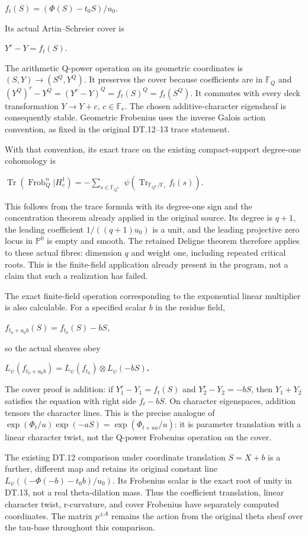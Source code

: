 \(f_t(S)=(\Phi(S)-t_0S)/u_0\).

Its actual Artin--Schreier cover is

\(Y^r-Y=f_t(S)\).

The arithmetic Q-power operation on its geometric coordinates is \((S,Y)\to (S^Q,Y^Q)\). It preserves the cover because coefficients are in \(\mathbb F_Q\) and \((Y^Q)^r-Y^Q=(Y^r-Y)^Q=f_t(S)^Q=f_t(S^Q)\). It commutes with every deck transformation \(Y\to Y+c\), \(c\in\mathbb F_r\). The chosen additive-character eigensheaf is consequently stable. Geometric Frobenius uses the inverse Galois action convention, as fixed in the original DT.12--13 trace statement.

With that convention, its exact trace on the existing compact-support degree-one cohomology is

\(\operatorname{Tr}(\operatorname{Frob}_Q^n|H_c^1)=-\sum_{s\in\mathbb F_{Q^n}}\) \(\psi(\operatorname{Tr}_{\mathbb F_{Q^n}/\mathbb F_r}f_t(s))\).

This follows from the trace formula with its degree-one sign and the concentration theorem already applied in the original source. Its degree is \(q+1\), the leading coefficient \(1/((q+1)u_0)\) is a unit, and the leading projective zero locus in \(\mathbb P^0\) is empty and smooth. The retained Deligne theorem therefore applies to these actual fibres: dimension \(q\) and weight one, including repeated critical roots. This is the finite-field application already present in the program, not a claim that such a realization has failed.

The exact finite-field operation corresponding to the exponential linear multiplier is also calculable. For a specified scalar \(b\) in the residue field,

\(f_{t_0+u_0 b}(S)=f_{t_0}(S)-bS\),

so the actual sheaves obey

\textbf{\(L_\psi(f_{t_0+u_0b})=L_\psi(f_{t_0}) \otimes L_\psi(-bS)\).}

The cover proof is addition: if \(Y_1^r-Y_1=f_t(S)\) and \(Y_2^r-Y_2=-bS\), then \(Y_1+Y_2\) satisfies the equation with right side \(f_t-bS\). On character eigenspaces, addition tensors the character lines. This is the precise analogue of \(\exp(\Phi_t/u)\exp(-aS)=\exp(\Phi_{t+ua}/u)\): it is parameter translation with a linear character twist, not the Q-power Frobenius operation on the cover.

The existing DT.12 comparison under coordinate translation \(S=X+b\) is a further, different map and retains its original constant line \(L_\psi((-\Phi(-b)-t_0b)/u_0)\). Its Frobenius scalar is the exact root of unity in DT.13, not a real theta-dilation mass. Thus the coefficient translation, linear character twist, r-curvature, and cover Frobenius have separately computed coordinates. The matrix \(p^{\pm A}\) remains the action from the original theta sheaf over the tau-base throughout this comparison.

